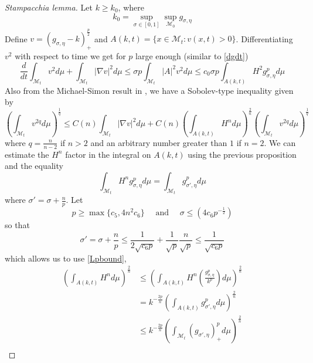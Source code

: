     \begin{proof}
        [Stampacchia lemma]

         Let $ k \ge k_{0} $, where $$ k_{0} = \sup_{\sigma \in [0,1]} \sup_{\mathcal{M}_{0}} g_{\sigma, \eta} $$
        Define $ v = (g_{\sigma,\eta} - k)_{+}^{\frac{p}{2}} $ and $ A(k,t) = \{x \in \mathcal{M}_{t} : v(x,t)>0\} $. Differentiating $ v^{2} $ with respect to time we get for $ p $ large enough (similar to \cref{dgdt})
        \begin{equation}
            \frac{d}{dt} \int_{\mathcal{M}_{t}}v^{2} d \mu + \int_{\mathcal{M}_{t}} |\nabla v|^{2} d \mu \le \sigma p \int_{\mathcal{M}_{t}} |A|^{2}v^{2} d \mu \le c_{0} \sigma p \int_{A(k,t)}H^{2}g_{\sigma, \eta}^{p} d \mu \label{vestimate}
        \end{equation}
        Also from the Michael-Simon result in \cite{https://doi.org/10.1002/cpa.3160260305}, we have a Sobolev-type inequality given by 
        \begin{equation}
            \left( \int_{\mathcal{M}_{t}}v^{2q} d \mu \right)^{\frac{1}{q}} \le C(n) \int_{\mathcal{M}_{t}} |\nabla v|^{2} d \mu +C(n)\left( \int_{A(k,t)}H^{n}d \mu \right)^{\frac{2}{n}}\left( \int_{\mathcal{M}_{t}}v^{2q} d \mu \right)^{\frac{1}{q}} \label{MS}
        \end{equation}
        where $ q = \frac{n}{n-2}$ if $ n >2 $ and an arbitrary number greater than $ 1 $ if $ n=2 $. We can estimate the $ H^{n} $ factor in the integral on $ A(k,t) $ using the previous proposition and the equality %
        \[ \int_{\mathcal{M}_{t}} H^{n} g_{\sigma, \eta}^{p}d \mu = \int_{\mathcal{M}_{t}}g_{\sigma', \eta}^{p} d \mu \]
        where $ \sigma' = \sigma + \frac{n}{p} $. Let 
        \[ p \ge \max\{c_{5},4n^{2}c_{6}\} \quad \text{ and } \quad \sigma \le (4c_{6}p^{-\frac{1}{2}}) \]
        so that 
        \[ \sigma' = \sigma + \frac{n}{p} \le \frac{1}{2\sqrt{c_{6}p}} + \frac{1}{\sqrt{p}} \frac{n}{\sqrt{p}} \le \frac{1}{\sqrt{c_{6}p}} \] 
        which allows us to use \cref{Lpbound}, \begin{align*}
            \left( \int_{A(k,t)} H^{n} d \mu \right)^{\frac{2}{n}} &\le \left( \int_{A(k,t)}H^{n} \left(\frac{g_{\sigma, \eta}^{p}}{k^{p}}\right) d \mu \right)^{\frac{2}{n}} \\
            & = k^{-\frac{2p}{n}} \left( \int_{A(k,t)}g_{\sigma',\eta}^{p}d \mu \right)^{\frac{2}{n}} \\
            & \le k^{-\frac{2p}{n}} \left( \int_{\mathcal{M}_{t}} (g_{\sigma',\eta})_{+}^{p} d \mu\right)^{\frac{2}{n}} \\

\end{align*}
\end{proof}
